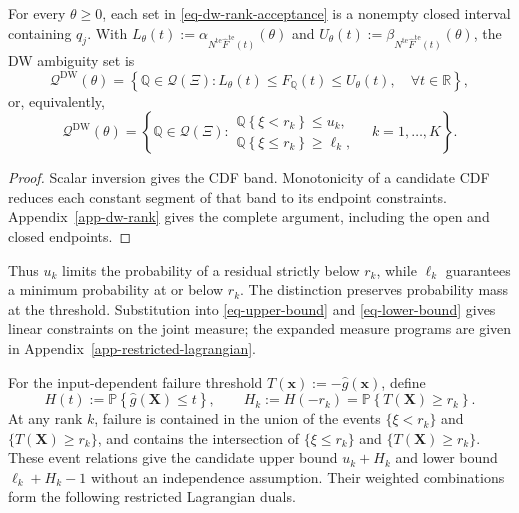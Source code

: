 \begin{proposition}
  \label{prop-finite-rank-constraints}
  For every $\theta\ge0$, each set in \eqref{eq-dw-rank-acceptance} is a nonempty closed interval containing $q_j$. With
  $L_\theta(t):=\alpha_{N^{\mathrm{te}}\widehat F^{\mathrm{te}}(t)}(\theta)$ and
  $U_\theta(t):=\beta_{N^{\mathrm{te}}\widehat F^{\mathrm{te}}(t)}(\theta)$, the DW ambiguity set is
  \begin{equation}
    \mathscr Q^{\mathrm{DW}}(\theta)
    =\left\{\mathbb Q\in\mathcal Q(\Xi):
    L_\theta(t)\le F_{\mathbb Q}(t)\le U_\theta(t),\quad\forall t\in\mathbb R\right\},
    \label{eq-dw-band-representation}
  \end{equation}
  or, equivalently,
  \begin{equation}
    \mathscr Q^{\mathrm{DW}}(\theta)
    =\left\{\mathbb Q\in\mathcal Q(\Xi):
    \begin{array}{l}
      \mathbb Q\left\{\xi<r_k\right\}\le u_k,\\
      \mathbb Q\left\{\xi\le r_k\right\}\ge\ell_k,
    \end{array}
    \quad k=1,\ldots,K\right\}.
    \label{eq-finite-rank-constraints}
  \end{equation}
\end{proposition}
\begin{proof}
  Scalar inversion gives the CDF band. Monotonicity of a candidate CDF reduces each constant segment of that band to its endpoint constraints. Appendix~\ref{app-dw-rank} gives the complete argument, including the open and closed endpoints.
\end{proof}

Thus $u_k$ limits the probability of a residual strictly below $r_k$, while $\ell_k$ guarantees a minimum probability at or below $r_k$. The distinction preserves probability mass at the threshold. Substitution into \eqref{eq-upper-bound} and \eqref{eq-lower-bound} gives linear constraints on the joint measure; the expanded measure programs are given in Appendix~\ref{app-restricted-lagrangian}.

For the input-dependent failure threshold $T(\bm x):=-\hat g(\bm x)$, define
\begin{equation}
  H(t):=\mathbb P\left\{\hat g(\bm X)\le t\right\},\qquad
  H_k:=H(-r_k)=\mathbb P\left\{T(\bm X)\ge r_k\right\}.
  \label{eq-surrogate-response-cdf}
\end{equation}
At any rank $k$, failure is contained in the union of the events $\{\xi<r_k\}$ and $\{T(\bm X)\ge r_k\}$, and contains the intersection of $\{\xi\le r_k\}$ and $\{T(\bm X)\ge r_k\}$. These event relations give the candidate upper bound $u_k+H_k$ and lower bound $\ell_k+H_k-1$ without an independence assumption. Their weighted combinations form the following restricted Lagrangian duals.

